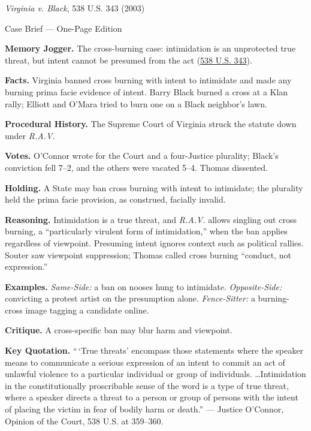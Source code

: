 \documentclass[12pt]{article}
\begin{document}
\begin{center}
{\Large \textit{Virginia v. Black}, 538 U.S. 343 (2003)\par}
\vspace{0.3em}
{\normalsize Case Brief --- One-Page Edition\par}
\end{center}

\textbf{Memory Jogger.} The cross-burning case: intimidation is an unprotected true threat, but intent cannot be presumed from the act (\href{https://supreme.justia.com/cases/federal/us/538/343/}{538 U.S. 343}).

\textbf{Facts.} Virginia banned cross burning with intent to intimidate and made any burning prima facie evidence of intent. Barry Black burned a cross at a Klan rally; Elliott and O'Mara tried to burn one on a Black neighbor's lawn.

\textbf{Procedural History.} The Supreme Court of Virginia struck the statute down under \textit{R.A.V.}

\textbf{Votes.} O'Connor wrote for the Court and a four-Justice plurality; Black's conviction fell 7--2, and the others were vacated 5--4. Thomas dissented.

\textbf{Holding.} A State may ban cross burning with intent to intimidate; the plurality held the prima facie provision, as construed, facially invalid.

\textbf{Reasoning.} Intimidation is a true threat, and \textit{R.A.V.} allows singling out cross burning, a ``particularly virulent form of intimidation,'' when the ban applies regardless of viewpoint. Presuming intent ignores context such as political rallies. Souter saw viewpoint suppression; Thomas called cross burning ``conduct, not expression.''

\textbf{Examples.} \emph{Same-Side:} a ban on nooses hung to intimidate. \emph{Opposite-Side:} convicting a protest artist on the presumption alone. \emph{Fence-Sitter:} a burning-cross image tagging a candidate online.

\textbf{Critique.} A cross-specific ban may blur harm and viewpoint.

\textbf{Key Quotation.} ``\,`True threats' encompass those statements where the speaker means to communicate a serious expression of an intent to commit an act of unlawful violence to a particular individual or group of individuals. \dots Intimidation in the constitutionally proscribable sense of the word is a type of true threat, where a speaker directs a threat to a person or group of persons with the intent of placing the victim in fear of bodily harm or death.'' --- Justice O'Connor, Opinion of the Court, 538 U.S. at 359--360.
\end{document}
